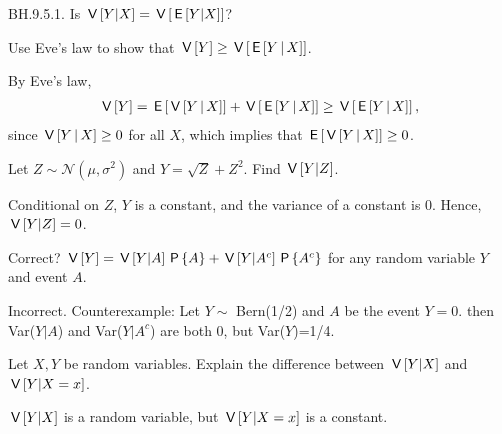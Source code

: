 \begin{exercise}
BH.9.5.1. Is $\V{Y|X}= \V{\E{Y|X}}$?
\begin{hint}
\end{hint}
\begin{solution}
\end{solution}
\end{exercise}



\begin{exercise}
Use Eve's law to show that $\V Y \geq \V{\E{Y\given X}}$.
\begin{solution}
By Eve's law,
\begin{align}
    \V Y = \E{\V{Y\given X}} + \V{\E{Y\given X}} \geq \V{\E{Y\given X}},
\end{align}
since $\V{Y\given X} \geq 0$ for all $X$, which implies that $\E{\V{Y\given X}} \geq 0$.
\end{solution}
\end{exercise}


\begin{exercise}
Let $Z\sim \mathcal{N}(\mu, \sigma^2)$ and $Y=\sqrt{Z}+Z^2.$ Find $\V{Y|Z}$.
\begin{solution}
Conditional on $Z$, $Y$ is a constant, and the variance of a constant is 0. Hence, $\V{Y|Z} = 0$.
\end{solution}
\end{exercise}


\begin{exercise}
Correct? $\V{Y}=\V{Y|A}\P{A}+\V{Y|A^c}\P{A^c}$ for any random variable $Y$ and event $A$.

\begin{solution}
Incorrect. Counterexample: Let $Y\sim$ Bern(1/2) and $A$ be the event $Y=0$. then Var($Y|A$) and Var($Y|A^c$) are both 0, but Var($Y$)=1/4.
\end{solution}
\end{exercise}


\begin{exercise}
Let $X, Y$ be random variables. Explain the difference between $\V{Y|X}$ and $\V{Y|X=x}$.

\begin{solution}
$\V{Y|X}$ is a random variable, but $\V{Y|X=x}$ is a constant.
\end{solution}
\end{exercise}


